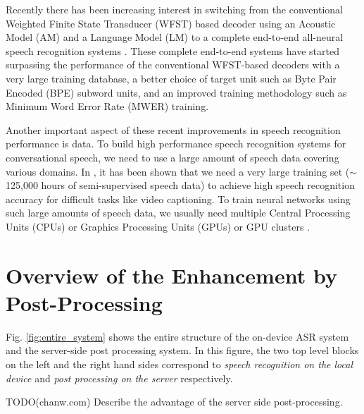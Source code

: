 \documentclass{article}
\begin{document}
Recently there has been increasing interest in switching
from the conventional Weighted Finite State Transducer (WFST)
based decoder using an Acoustic Model (AM) and a Language Model (LM)
to a complete end-to-end all-neural speech recognition systems
\cite{w_chan_icassp_2016_00, r_prabhavalkar_interspeech_2017_00,
j_chorowski_nips_2015_00}.
These complete end-to-end systems have started surpassing the performance of
the conventional WFST-based decoders with a very large training
database, a better choice of target unit such as Byte Pair Encoded (BPE)
subword units, and an improved training methodology such as Minimum
Word Error Rate (MWER) training.

Another important aspect of these recent improvements in speech
recognition performance is data.
To build high performance speech recognition systems for
conversational speech, we need to use
a large amount of speech data covering various domains. In
\cite{h_soltau_interspeech_2017_00}, it has been shown
that we need a very large training set ($\sim$125,000 hours of
semi-supervised speech data) to achieve
high speech recognition accuracy for difficult tasks like
video captioning. To train neural networks using such large
amounts of speech data, we usually need
multiple Central Processing Units (CPUs) or Graphics
Processing Units (GPUs) or GPU clusters
\cite{E_Variani_INTERSPEECH_2017_01, p_goyal_arxiv_2018_00}.




\section{Overview of the Enhancement by Post-Processing}


Fig. \ref{fig:entire_system} shows the entire structure of the on-device ASR
system and the server-side post processing system. In this figure,  
the two top level blocks on the left and the right hand sides correspond
to {\it speech recognition on the local device} and 
{\it post processing on the server} respectively.  

TODO(chanw.com) Describe the advantage of the server side post-processing.
\end{document}
